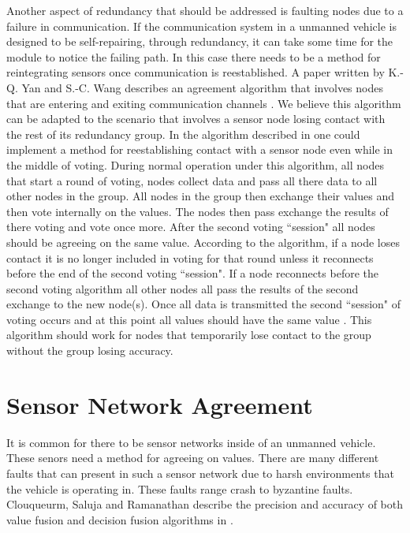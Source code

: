 \documentclass[twoside, conference]{IEEEtran}
\begin{document}
Another aspect of redundancy that should be addressed is faulting nodes due to a failure in communication. If the communication system in a unmanned vehicle is designed to be self-repairing, through redundancy, it can take some time for the module to notice the failing path. In this case there needs to be a method for reintegrating sensors once communication is reestablished. A paper written by K.-Q. Yan and S.-C. Wang describes an agreement algorithm that involves nodes that are entering and exiting communication channels \cite{Yan2007}. We believe this algorithm can be adapted to the scenario that involves a sensor node losing contact with the rest of its redundancy group. In the algorithm described in \cite{Yan2007} one could implement a method for reestablishing contact with a sensor node even while in the middle of voting. During normal operation under this algorithm, all nodes that start a round of voting, nodes collect data and pass all there data to all other nodes in the group. All nodes in the group then exchange their values and then vote internally on the values. The nodes then pass exchange the results of there voting and vote once more. After the second voting ``session" all nodes should be agreeing on the same value. According to the algorithm, if a node loses contact it is no longer included in voting for that round unless it reconnects before the end of the second voting ``session". If a node reconnects before the second voting algorithm all other nodes all pass the results of the second exchange to the new node(s). Once all data is transmitted the second ``session" of voting occurs and at this point all values should have the same value \cite{Yan2007}. This algorithm should work for nodes that temporarily lose contact to the group without the group losing accuracy.

\section{Sensor Network Agreement}\label{sec:sensornet-agreement}
It is common for there to be sensor networks inside of an unmanned vehicle. These senors need a method for agreeing on values. There are many different faults that can present in such a sensor network due to harsh environments that the vehicle is operating in. These faults range crash to byzantine faults. Clouqueurm, Saluja and Ramanathan describe the precision and accuracy of both value fusion and decision fusion algorithms in \cite{clouqueur2004}. 
\end{document}
